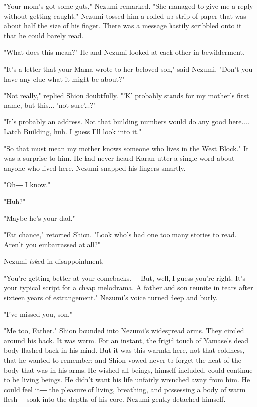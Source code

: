 "Your mom's got some guts," Nezumi remarked. "She managed to give me a
reply without getting caught." Nezumi tossed him a rolled-up strip of
paper that was about half the size of his finger. There was a message
hastily scribbled onto it that he could barely read.


"What does this mean?" He and Nezumi looked at each other in
bewilderment.

"It's a letter that your Mama wrote to her beloved son," said Nezumi.
"Don't you have any clue what it might be about?"

"Not really," replied Shion doubtfully. "'K' probably stands for my
mother's first name, but this... 'not sure'...?"

"It's probably an address. Not that building numbers would do any good
here.... Latch Building, huh. I guess I'll look into it."

"So that must mean my mother knows someone who lives in the West Block."
It was a surprise to him. He had never heard Karan utter a single word
about anyone who lived here. Nezumi snapped his fingers smartly.

"Oh― I know."

"Huh?"

"Maybe he's your dad."

"Fat chance," retorted Shion. "Look who's had one too many stories to
read. Aren't you embarrassed at all?"

Nezumi \emph{tsk}ed in disappointment.

"You're getting better at your comebacks. ―But, well, I guess you're
right. It's your typical script for a cheap melodrama. A father and son
reunite in tears after sixteen years of estrangement." Nezumi's voice
turned deep and burly.

"I've missed you, son."

"Me too, Father." Shion bounded into Nezumi's widespread arms. They
circled around his back. It was warm. For an instant, the frigid touch
of Yamase's dead body flashed back in his mind. But it was this warmth
here, not that coldness, that he wanted to remember; and Shion vowed
never to forget the heat of the body that was in his arms. He wished all
beings, himself included, could continue to be living beings. He didn't
want his life unfairly wrenched away from him. He could feel it― the
pleasure of living, breathing, and possessing a body of warm flesh― soak
into the depths of his core. Nezumi gently detached himself.

